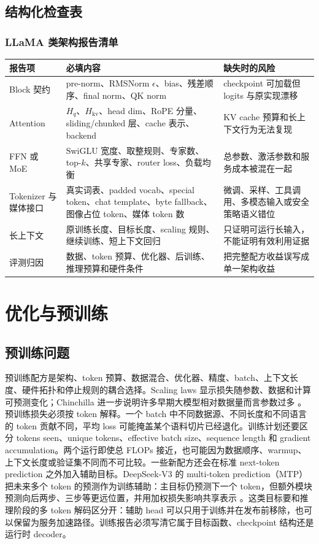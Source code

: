 \documentclass[UTF8,zihao=-4,openany]{ctexbook}
\begin{document}
\section{结构化检查表}
\subsection{LLaMA 类架构报告清单}
\begin{center}
\begin{tabular}{p{}p{}p{}}
\toprule
报告项 & 必填内容 & 缺失时的风险 \\
\midrule
Block 契约 & pre-norm、RMSNorm $\epsilon$、bias、残差顺序、final norm、QK norm & checkpoint 可加载但 logits 与原实现漂移 \\
Attention & $H_q$、$H_{\mathrm{kv}}$、head dim、RoPE 分量、sliding/chunked 层、cache 表示、backend & KV cache 预算和长上下文行为无法复现 \\
FFN 或 MoE & SwiGLU 宽度、取整规则、专家数、top-$k$、共享专家、router loss、负载均衡 & 总参数、激活参数和服务成本被混在一起 \\
Tokenizer 与媒体接口 & 真实词表、padded vocab、special token、chat template、byte fallback、图像占位 token、媒体 token 数 & 微调、采样、工具调用、多模态输入或安全策略语义错位 \\
长上下文 & 原训练长度、目标长度、scaling 规则、继续训练、短上下文回归 & 只证明可运行长输入，不能证明有效利用证据 \\
评测归因 & 数据、token 预算、优化器、后训练、推理预算和硬件条件 & 把完整配方收益误写成单一架构收益 \\
\bottomrule
\end{tabular}
\end{center}

\chapter{优化与预训练}
\section{预训练问题}
预训练配方是架构、token 预算、数据混合、优化器、精度、batch、上下文长度、硬件拓扑和停止规则的耦合选择。Scaling laws 显示损失随参数、数据和计算可预测变化；Chinchilla 进一步说明许多早期大模型相对数据量而言参数过多 \cite{kaplan2020scaling,hoffmann2022training}。预训练损失必须按 token 解释。一个 batch 中不同数据源、不同长度和不同语言的 token 贡献不同，平均 loss 可能掩盖某个语料切片已经退化。训练计划还要区分 tokens seen、unique tokens、effective batch size、sequence length 和 gradient accumulation。两个运行即使总 FLOPs 接近，也可能因为数据顺序、warmup、上下文长度或验证集不同而不可比较。一些新配方还会在标准 next-token prediction 之外加入辅助目标。DeepSeek-V3 的 multi-token prediction（MTP）把未来多个 token 的预测作为训练辅助：主目标仍预测下一个 token，但额外模块预测向后两步、三步等更远位置，并用加权损失影响共享表示 \cite{deepseek2024v3}。这类目标要和推理阶段的多 token 解码区分开：辅助 head 可以只用于训练并在发布前移除，也可以保留为服务加速路径。训练报告必须写清它属于目标函数、checkpoint 结构还是运行时 decoder。
\end{document}
